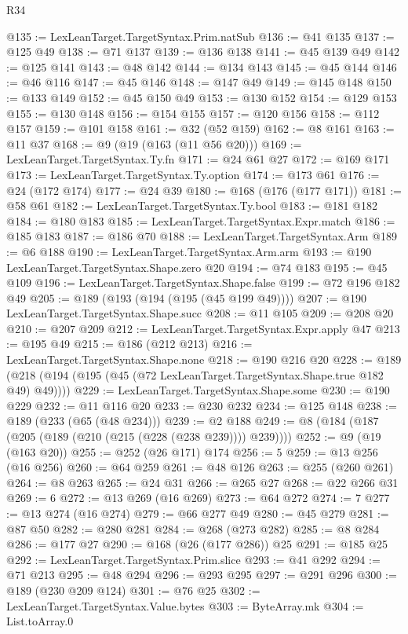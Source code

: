 \begin{lexlean}{R34}
\begin{coremodule}
@135 := LexLeanTarget.TargetSyntax.Prim.natSub
@136 := @41 @135
@137 := @125 @49
@138 := @71 @137
@139 := @136 @138
@141 := @45 @139 @49
@142 := @125 @141
@143 := @48 @142
@144 := @134 @143
@145 := @45 @144
@146 := @46 @116
@147 := @45 @146
@148 := @147 @49
@149 := @145 @148
@150 := @133 @149
@152 := @45 @150 @49
@153 := @130 @152
@154 := @129 @153
@155 := @130 @148
@156 := @154 @155
@157 := @120 @156
@158 := @112 @157
@159 := @101 @158
@161 := @32 (@52 @159)
@162 := @8 @161
@163 := @11 @37
@168 := @9 (@19 (@163 (@11 @56 @20)))
@169 := LexLeanTarget.TargetSyntax.Ty.fn
@171 := @24 @61 @27
@172 := @169 @171
@173 := LexLeanTarget.TargetSyntax.Ty.option
@174 := @173 @61
@176 := @24 (@172 @174)
@177 := @24 @39
@180 := @168 (@176 (@177 @171))
@181 := @58 @61
@182 := LexLeanTarget.TargetSyntax.Ty.bool
@183 := @181 @182
@184 := @180 @183
@185 := LexLeanTarget.TargetSyntax.Expr.match
@186 := @185 @183
@187 := @186 @70
@188 := LexLeanTarget.TargetSyntax.Arm
@189 := @6 @188
@190 := LexLeanTarget.TargetSyntax.Arm.arm
@193 := @190 LexLeanTarget.TargetSyntax.Shape.zero @20
@194 := @74 @183
@195 := @45 @109
@196 := LexLeanTarget.TargetSyntax.Shape.false
@199 := @72 @196 @182 @49
@205 := @189 (@193 (@194 (@195 (@45 @199 @49))))
@207 := @190 LexLeanTarget.TargetSyntax.Shape.succ
@208 := @11 @105
@209 := @208 @20
@210 := @207 @209
@212 := LexLeanTarget.TargetSyntax.Expr.apply @47
@213 := @195 @49
@215 := @186 (@212 @213)
@216 := LexLeanTarget.TargetSyntax.Shape.none
@218 := @190 @216 @20
@228 := @189 (@218 (@194 (@195 (@45 (@72 LexLeanTarget.TargetSyntax.Shape.true @182 @49) @49))))
@229 := LexLeanTarget.TargetSyntax.Shape.some
@230 := @190 @229
@232 := @11 @116 @20
@233 := @230 @232
@234 := @125 @148
@238 := @189 (@233 (@65 (@48 @234)))
@239 := @2 @188
@249 := @8 (@184 (@187 (@205 (@189 (@210 (@215 (@228 (@238 @239)))) @239))))
@252 := @9 (@19 (@163 @20))
@255 := @252 (@26 @171) @174
@256 := 5
@259 := @13 @256 (@16 @256)
@260 := @64 @259
@261 := @48 @126
@263 := @255 (@260 @261)
@264 := @8 @263
@265 := @24 @31
@266 := @265 @27
@268 := @22 @266 @31
@269 := 6
@272 := @13 @269 (@16 @269)
@273 := @64 @272
@274 := 7
@277 := @13 @274 (@16 @274)
@279 := @66 @277 @49
@280 := @45 @279
@281 := @87 @50
@282 := @280 @281
@284 := @268 (@273 @282)
@285 := @8 @284
@286 := @177 @27
@290 := @168 (@26 (@177 @286)) @25
@291 := @185 @25
@292 := LexLeanTarget.TargetSyntax.Prim.slice
@293 := @41 @292
@294 := @71 @213
@295 := @48 @294
@296 := @293 @295
@297 := @291 @296
@300 := @189 (@230 @209 @124)
@301 := @76 @25
@302 := LexLeanTarget.TargetSyntax.Value.bytes
@303 := ByteArray.mk
@304 := List.toArray.{0}

\end{coremodule}
\end{lexlean}
